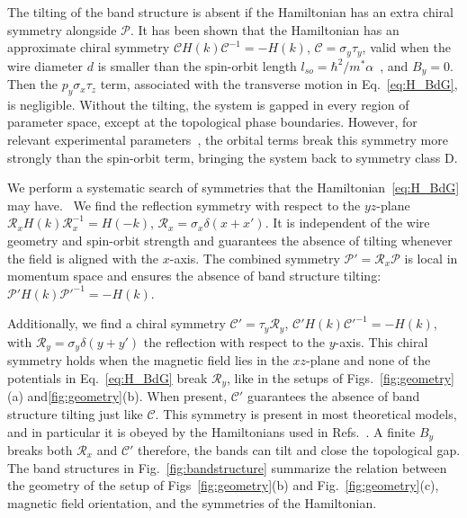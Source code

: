 
The tilting of the band structure is absent if the Hamiltonian has an extra chiral symmetry alongside $\mathcal{P}$.
It has been shown that the Hamiltonian has an approximate chiral symmetry $\mathcal{C}H\left(k\right)\mathcal{C}^{-1}=-H\left(k\right)$, $\mathcal{C}=\sigma_y \tau_y$, valid when the wire diameter $d$ is smaller than the spin-orbit length $l_{so}=\hbar^{2}/m^{*}\alpha$~\cite{Tewari2012,Diez2012}, and $B_y=0$.
Then the $p_{y}\sigma_x \tau_z$ term, associated with the transverse motion in Eq.~\eqref{eq:H_BdG}, is negligible.
Without the tilting, the system is gapped in every region of parameter space, except at the topological phase boundaries.
However, for relevant experimental parameters~\cite{Mourik2012}, the orbital terms break this symmetry more strongly than the spin-orbit term, bringing the system back to symmetry class D.


We perform a systematic search of symmetries that the Hamiltonian~\eqref{eq:H_BdG} may have.~\cite{rosdahl}
We find the reflection symmetry with respect to the $yz$-plane $\mathcal{R}_x H\left(k\right)\mathcal{R}_x^{-1}=H\left(-k\right)$, $\mathcal{R}_x=\sigma_x\delta(x+x')$.
It is independent of the wire geometry and spin-orbit strength and guarantees the absence of tilting whenever the field is aligned with the $x$-axis.
The combined symmetry $\mathcal{P}' = \mathcal{R}_x \mathcal{P}$ is local in momentum space and ensures the absence of band structure tilting: $\mathcal{P}' H(k) \mathcal{P}'^{-1} = -H(k)$.


Additionally, we find a chiral symmetry $\mathcal{C}'=\tau_y\mathcal{R}_y$, $\mathcal{C}'H\left(k\right)\mathcal{C}'^{-1}=-H\left(k\right)$, with $\mathcal{R}_y = \sigma_y \delta(y + y')$ the reflection with respect to the $y$-axis.
This chiral symmetry holds when the magnetic field lies in the $xz$-plane and none of the potentials in Eq.~\eqref{eq:H_BdG} break $\mathcal{R}_y$, like in the setups of Figs.~\ref{fig:geometry}(a) and\ref{fig:geometry}(b).
When present, $\mathcal{C}'$ guarantees the absence of band structure tilting just like $\mathcal{C}$.
This symmetry is present in most theoretical models, and in particular it is obeyed by the Hamiltonians used in Refs.~\cite{Osca2015,Lim2013,Lim2012}.
A finite $B_y$ breaks both $\mathcal{R}_x$ and $\mathcal{C}'$ therefore, the bands can tilt and close the topological gap.
The band structures in Fig.~\ref{fig:bandstructure} summarize the relation between the geometry of the setup of Figs~\ref{fig:geometry}(b) and Fig.~\ref{fig:geometry}(c), magnetic field orientation, and the symmetries of the Hamiltonian.

